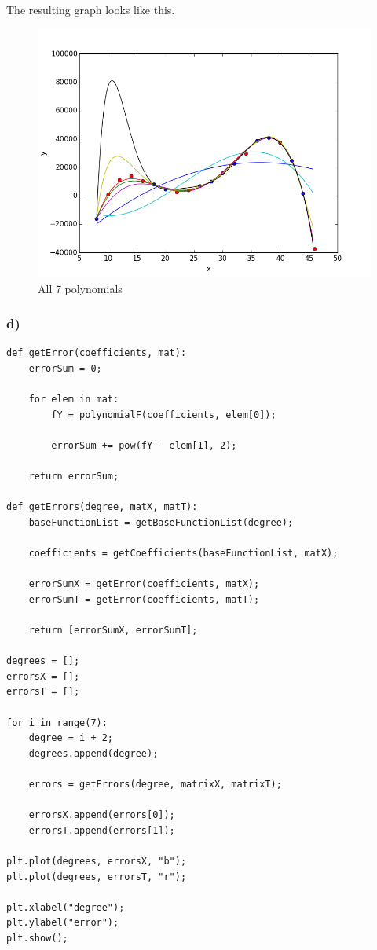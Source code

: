 The resulting graph looks like this.

\begin{figure}[!ht]
\includegraphics[width=1\textwidth]{chapters/images/figure-5-11-c}
\caption{All 7 polynomials}
\end{figure}


\subsubsection{d)}

\begin{lstlisting}[caption=Problem 5.11 d)]
def getError(coefficients, mat):
	errorSum = 0;
	
	for elem in mat:
		fY = polynomialF(coefficients, elem[0]);
		
		errorSum += pow(fY - elem[1], 2);
	
	return errorSum;

def getErrors(degree, matX, matT):
	baseFunctionList = getBaseFunctionList(degree);
	
	coefficients = getCoefficients(baseFunctionList, matX);
	
	errorSumX = getError(coefficients, matX);
	errorSumT = getError(coefficients, matT);
	
	return [errorSumX, errorSumT];

degrees = [];
errorsX = [];
errorsT = [];

for i in range(7):
	degree = i + 2;
	degrees.append(degree);
	
	errors = getErrors(degree, matrixX, matrixT);
	
	errorsX.append(errors[0]);
	errorsT.append(errors[1]);

plt.plot(degrees, errorsX, "b");
plt.plot(degrees, errorsT, "r");

plt.xlabel("degree");
plt.ylabel("error");
plt.show();
\end{lstlisting}


